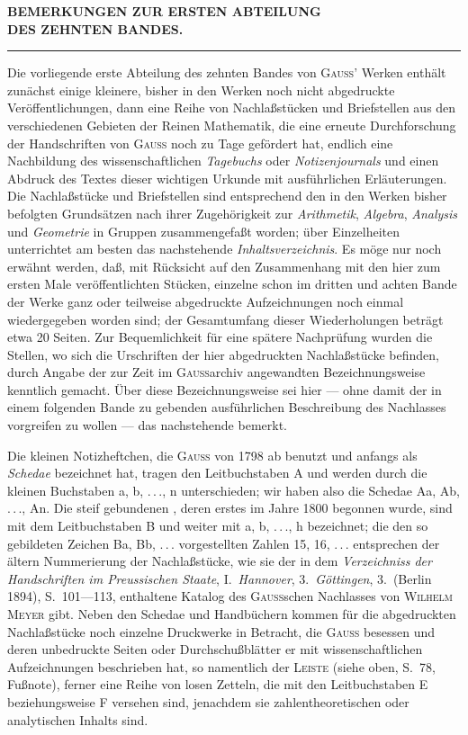 \clearpage
{}
\NoSourceHead
\begin{center}\large\bfseries BEMERKUNGEN ZUR ERSTEN ABTEILUNG\\DES ZEHNTEN BANDES.\end{center}
\begin{center}\rule{.1\linewidth}{.4pt}\end{center}
\medskip
Die vorliegende erste Abteilung des zehnten Bandes von \textsc{Gauss}’ Werken enthält zunächst einige kleinere, bisher in den Werken noch nicht abgedruckte Veröffentlichungen, dann eine Reihe von Nachlaßstücken und Briefstellen aus den verschiedenen Gebieten der Reinen Mathematik, die eine erneute Durchforschung der Handschriften von \textsc{Gauss} noch zu Tage gefördert hat, endlich eine Nachbildung des wissenschaftlichen \emph{Tagebuchs} oder \emph{Notizenjournals} und einen Abdruck des Textes dieser wichtigen Urkunde mit ausführlichen Erläuterungen. Die Nachlaßstücke und Briefstellen sind entsprechend den in den Werken bisher befolgten Grundsätzen nach ihrer Zugehörigkeit zur \emph{Arithmetik}, \emph{Algebra}, \emph{Analysis} und \emph{Geometrie} in Gruppen zusammengefaßt worden; über Einzelheiten unterrichtet am besten das nachstehende \emph{Inhaltsverzeichnis}. Es möge nur noch erwähnt werden, daß, mit Rücksicht auf den Zusammenhang mit den hier zum ersten Male veröffentlichten Stücken, einzelne schon im dritten und achten Bande der Werke ganz oder teilweise abgedruckte Aufzeichnungen noch einmal wiedergegeben worden sind; der Gesamtumfang dieser Wiederholungen beträgt etwa 20 Seiten. Zur Bequemlichkeit für eine spätere Nachprüfung wurden die Stellen, wo sich die Urschriften der hier abgedruckten Nachlaßstücke befinden, durch Angabe der zur Zeit im \textsc{Gauss}archiv angewandten Bezeichnungsweise kenntlich gemacht. Über diese Bezeichnungsweise sei hier — ohne damit der in einem folgenden Bande zu gebenden ausführlichen Beschreibung des Nachlasses vorgreifen zu wollen — das nachstehende bemerkt.

Die kleinen Notizheftchen, die \textsc{Gauss} von 1798 ab benutzt und anfangs als \emph{Schedae} bezeichnet hat, tragen den Leitbuchstaben A und werden durch die kleinen Buchstaben a, b, .\,.\,., n unterschieden; wir haben also die Schedae Aa, Ab, .\,.\,., An. Die steif gebundenen , deren erstes im Jahre 1800 begonnen wurde, sind mit dem Leitbuchstaben B und weiter mit a, b, .\,.\,., h bezeichnet; die den so gebildeten Zeichen Ba, Bb, .\,.\,. vorgestellten Zahlen 15, 16, .\,.\,. entsprechen der ältern Nummerierung der Nachlaßstücke, wie sie der in dem \emph{Verzeichniss der Handschriften im Preussischen Staate}, I.\ \emph{Hannover}, 3.\ \emph{Göttingen}, 3.\ (Berlin 1894), S.\ 101—113, enthaltene Katalog des \textsc{Gauss}schen Nachlasses von \textsc{Wilhelm Meyer} gibt. Neben den Schedae und Handbüchern kommen für die abgedruckten Nachlaßstücke noch einzelne Druckwerke in Betracht, die \textsc{Gauss} besessen und deren unbedruckte Seiten oder Durchschußblätter er mit wissenschaftlichen Aufzeichnungen beschrieben hat, so namentlich der \textsc{Leiste} (siehe oben, S.\ 78, Fußnote), ferner eine Reihe von losen Zetteln, die mit den Leitbuchstaben E beziehungsweise F versehen sind, jenachdem sie zahlentheoretischen oder analytischen Inhalts sind.


